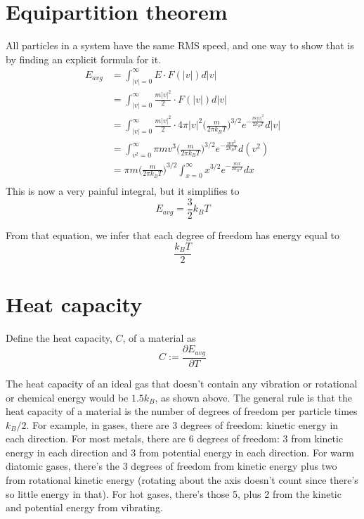 \documentclass[12pt]{article}
\begin{document}
\section{Equipartition theorem}
All particles in a system have the same RMS speed, and one way to show that is by finding an explicit formula for it.
\begin{align*}
    E_{avg} &= \int_{|v|=0}^\infty E \cdot F(|v|) d|v| \\
    &= \int_{|v|=0}^\infty \frac{m |v|^2}{2}  \cdot F(|v|) d|v| \\
    &= \int_{|v|=0}^\infty \frac{m |v|^2}{2} \cdot 4 \pi |v|^2 \Big( \frac{m}{2 \pi k_B T} \Big)^{3/2} e^{-\frac{m |v|^2}{2 k_B T}} d|v| \\
    &= \int_{v^2=0}^\infty \pi m v^3 \Big( \frac{m}{2 \pi k_B T} \Big)^{3/2} e^{-\frac{m v^2}{2 k_B T}} d(v^2) \\
    &= \pi m \Big( \frac{m}{2 \pi k_B T} \Big)^{3/2} \int_{x=0}^\infty x^{3/2} e^{-\frac{m x}{2 k_B T}} dx \\
\end{align*}
This is now a very painful integral, but it simplifies to
\[E_{avg} = \frac{3}{2} k_B T\]

From that equation, we infer that each degree of freedom has energy equal to
\[ \frac{k_B T}{2} \]


\section{Heat capacity}
Define the heat capacity, $C$, of a material as
\[C := \frac{\partial E_{avg}}{\partial T} \]

The heat capacity of an ideal gas that doesn't contain any vibration or rotational or chemical energy would be $1.5 k_B$, as shown above. The general rule is that the heat capacity of a material is the number of degrees of freedom per particle times $k_B / 2$. For example, in gases, there are 3 degrees of freedom: kinetic energy in each direction. For most metals, there are 6 degrees of freedom: 3 from kinetic energy in each direction and 3 from potential energy in each direction. For warm diatomic gases, there's the 3 degrees of freedom from kinetic energy plus two from rotational kinetic energy (rotating about the axis doesn't count since there's so little energy in that). For hot gases, there's those 5, plus 2 from the kinetic and potential energy from vibrating.
\end{document}
